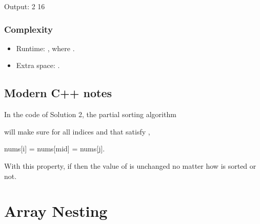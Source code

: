 \documentclass[letterpaper,12pt,english]{book}
\begin{document}
\begin{sphinxVerbatim}[commandchars=\\\{\}]
Output:
2
16
\end{sphinxVerbatim}


\subsubsection{Complexity}
\label{\detokenize{Mathematics/09_MTH_462_Minimum_Moves_to_Equal_Array_Elements_II:id2}}\begin{itemize}
\item {} 
\sphinxAtStartPar
Runtime: , where .

\item {} 
\sphinxAtStartPar
Extra space: .

\end{itemize}


\subsection{Modern C++ notes}
\label{\detokenize{Mathematics/09_MTH_462_Minimum_Moves_to_Equal_Array_Elements_II:modern-c-notes}}
\sphinxAtStartPar
In the code of Solution 2, the partial sorting algorithm %
\begin{footnote}[132]\sphinxAtStartFootnote
{}
%
\end{footnote} will make sure for all indices  and  that satisfy ,

\begin{sphinxVerbatim}[commandchars=\\\{\}]
nums[i] \PYGZlt{}= nums[mid] \PYGZlt{}= nums[j].
\end{sphinxVerbatim}

\sphinxAtStartPar
With this property, if  then the value of  is unchanged no matter how  is sorted or not.

\sphinxstepscope


\section{Array Nesting}
\label{\detokenize{Mathematics/09_MTH_565_Array_Nesting:array-nesting}}\label{\detokenize{Mathematics/09_MTH_565_Array_Nesting::doc}}
\end{document}
